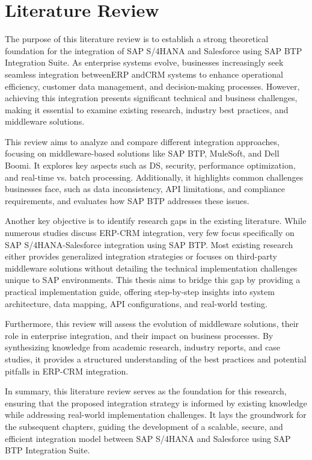 
\chapter{Literature Review}

The purpose of this literature review is to establish a strong theoretical foundation for the integration of SAP S/4HANA and Salesforce using SAP BTP Integration Suite. As enterprise systems evolve, businesses increasingly seek seamless integration betweenERP andCRM systems to enhance operational efficiency, customer data management, and decision-making processes. However, achieving this integration presents significant technical and business challenges, making it essential to examine existing research, industry best practices, and middleware solutions.

This review aims to analyze and compare different integration approaches, focusing on middleware-based solutions like SAP BTP, MuleSoft, and Dell Boomi. It explores key aspects such as DS, security, performance optimization, and real-time vs. batch processing. Additionally, it highlights common challenges businesses face, such as data inconsistency, API limitations, and compliance requirements, and evaluates how SAP BTP addresses these issues.

Another key objective is to identify research gaps in the existing literature. While numerous studies discuss ERP-CRM integration, very few focus specifically on SAP S/4HANA-Salesforce integration using SAP BTP. Most existing research either provides generalized integration strategies or focuses on third-party middleware solutions without detailing the technical implementation challenges unique to SAP environments. This thesis aims to bridge this gap by providing a practical implementation guide, offering step-by-step insights into system architecture, data mapping, API configurations, and real-world testing.

Furthermore, this review will assess the evolution of middleware solutions, their role in enterprise integration, and their impact on business processes. By synthesizing knowledge from academic research, industry reports, and case studies, it provides a structured understanding of the best practices and potential pitfalls in ERP-CRM integration.

In summary, this literature review serves as the foundation for this research, ensuring that the proposed integration strategy is informed by existing knowledge while addressing real-world implementation challenges. It lays the groundwork for the subsequent chapters, guiding the development of a scalable, secure, and efficient integration model between SAP S/4HANA and Salesforce using SAP BTP Integration Suite.

